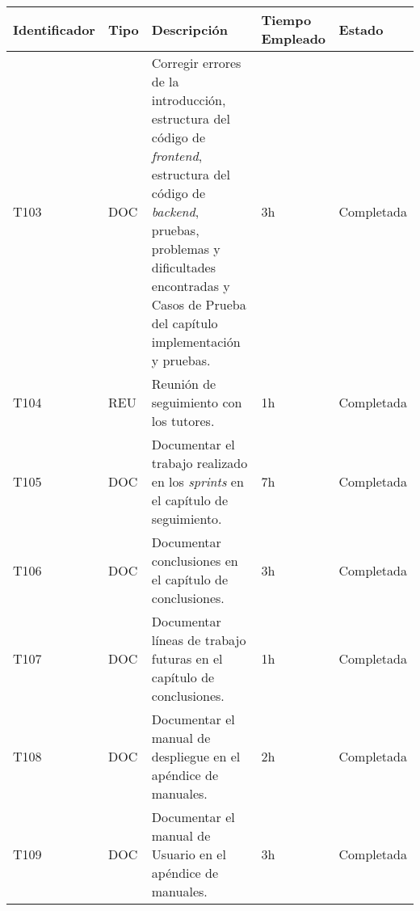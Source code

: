 \begin{table}[]
  \centering
\begin{tabular}{
  |p{}%
  |p{}%
  |p{}
  |p{}
  |p{}
  |%
  }
  \hline
  \textbf{Identificador} & \textbf{Tipo} & \textbf{Descripción}                                             & \textbf{Tiempo Empleado} & \textbf{Estado} \\ \hline

  T103                   & DOC          & Corregir errores de la introducción, estructura del código de \textit{frontend}, estructura del código de \textit{backend}, pruebas, problemas y dificultades encontradas y Casos de Prueba del capítulo implementación y pruebas.                & 3h                       & Completada      \\ \hline

  T104                   & REU           & Reunión de seguimiento con los tutores.                             & 1h                       & Completada      \\ \hline

  T105                   & DOC           & Documentar el trabajo realizado en los \textit{sprints} en el capítulo de seguimiento.            & 7h                       & Completada      \\ \hline

 

  T106                   & DOC           & Documentar conclusiones en el capítulo de conclusiones.           & 3h                       & Completada      \\ \hline
  T107                   & DOC           & Documentar líneas de trabajo futuras en el capítulo de conclusiones.           & 1h                       & Completada      \\ \hline



  T108                   & DOC           & Documentar el manual de despliegue en el apéndice de manuales.        & 2h                       & Completada      \\ \hline

  T109                   & DOC           & Documentar el manual de Usuario en el apéndice de manuales.        & 3h                       & Completada      \\ \hline







\end{tabular}
\end{table}
